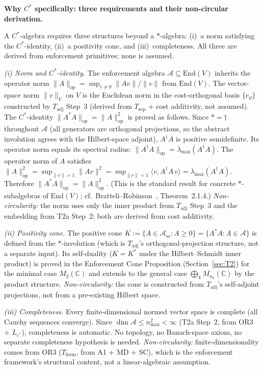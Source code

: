 \documentclass[11pt]{article}
\theoremstyle{remark}
\begin{document}
\medskip\noindent\textbf{Why $C^*$ specifically: three requirements and their non-circular derivation.}

A $C^*$-algebra requires three structures beyond a $*$-algebra: (i)~a norm satisfying the $C^*$-identity, (ii)~a positivity cone, and (iii)~completeness.  All three are derived from enforcement primitives; none is assumed.

\smallskip\noindent\textit{(i) Norm and $C^*$-identity.}  The enforcement algebra $\mathcal{A} \subseteq \mathrm{End}(V)$ inherits the operator norm $\|A\|_{\mathrm{op}} = \sup_{v \ne 0} \|Av\|/\|v\|$ from $\mathrm{End}(V)$.  The vector-space norm $\|v\|_V$ on $V$ is the Euclidean norm in the cost-orthogonal basis $\{e_d\}$ constructed by $T_{\mathrm{adj}}$ Step~3 (derived from $T_{\mathrm{sep}}$ + cost additivity, not assumed).  The $C^*$-identity $\|A^*A\|_{\mathrm{op}} = \|A\|_{\mathrm{op}}^2$ is proved as follows.  Since $* = \dagger$ throughout $\mathcal{A}$ (all generators are orthogonal projections, so the abstract involution agrees with the Hilbert-space adjoint), $A^\dagger A$ is positive semidefinite.  Its operator norm equals its spectral radius: $\|A^\dagger A\|_{\mathrm{op}} = \lambda_{\max}(A^\dagger A)$.  The operator norm of $A$ satisfies $\|A\|_{\mathrm{op}}^2 = \sup_{\|v\|=1} \|Av\|^2 = \sup_{\|v\|=1} \langle v, A^\dagger A\, v\rangle = \lambda_{\max}(A^\dagger A)$.  Therefore $\|A^*A\|_{\mathrm{op}} = \|A\|_{\mathrm{op}}^2$.  (This is the standard result for concrete $*$-subalgebras of $\mathrm{End}(V)$; cf.\ Bratteli--Robinson~\cite{BratteliRobinson1987}, Theorem~2.1.4.)  \emph{Non-circularity:} the norm uses only the inner product from $T_{\mathrm{adj}}$ Step~3 and the embedding from T2a Step~2; both are derived from cost additivity.

\smallskip\noindent\textit{(ii) Positivity cone.}  The positive cone $K := \{A \in \mathcal{A}_{\mathrm{sa}} : A \ge 0\} = \{A^*A : A \in \mathcal{A}\}$ is defined from the $*$-involution (which is $T_{\mathrm{adj}}$'s orthogonal-projection structure, not a separate input).  Its self-duality ($K = K^*$ under the Hilbert--Schmidt inner product) is proved in the Enforcement Cone Proposition (Section~\ref{sec:T2}) for the minimal case $M_2(\mathbb{C})$ and extends to the general case $\bigoplus_k M_{n_k}(\mathbb{C})$ by the product structure.  \emph{Non-circularity:} the cone is constructed from $T_{\mathrm{adj}}$'s self-adjoint projections, not from a pre-existing Hilbert space.

\smallskip\noindent\textit{(iii) Completeness.}  Every finite-dimensional normed vector space is complete (all Cauchy sequences converge).  Since $\dim \mathcal{A} \le n_{\max}^2 < \infty$ (T2a Step~2, from OR3 + $L_{\varepsilon^*}$), completeness is automatic.  No topology, no Banach-space axiom, no separate completeness hypothesis is needed.  \emph{Non-circularity:} finite-dimensionality comes from OR3 ($T_{\mathrm{form}}$, from A1 + MD + SC), which is the enforcement framework's structural content, not a linear-algebraic assumption.
\end{document}
